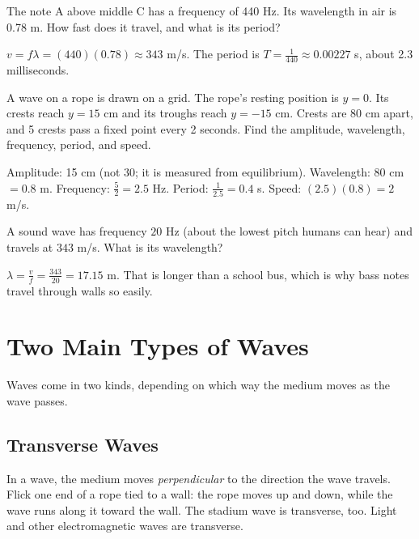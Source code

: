 \begin{Worked}
\begin{Problem}
The note A above middle C has a frequency of
440 Hz. Its wavelength in air is 0.78 m. How fast does it travel, and what
is its period?
\end{Problem}
\begin{Solution}
$v = f\lambda = (440)(0.78) \approx 343$ m/s. The period
is $T = \frac{1}{440} \approx 0.00227$ s, about 2.3 milliseconds.
\end{Solution}
\end{Worked}

\begin{Exercise}[title={Label the wave}, label=wave_label]
A wave on a rope is drawn on a grid. The rope's resting position is
$y = 0$. Its crests reach $y = 15$ cm and its troughs reach $y = -15$ cm.
Crests are 80 cm apart, and 5 crests pass a fixed point every 2 seconds.
Find the amplitude, wavelength, frequency, period, and speed.
\end{Exercise}
\begin{Answer}[ref=wave_label]
Amplitude: 15 cm (not 30; it is measured from equilibrium). Wavelength:
80 cm $= 0.8$ m. Frequency: $\frac{5}{2} = 2.5$ Hz. Period:
$\frac{1}{2.5} = 0.4$ s. Speed: $(2.5)(0.8) = 2$ m/s.
\end{Answer}

\begin{Exercise}[title={Wavelength of a Low Note}, label=wave1]
A sound wave has frequency $20$ Hz (about the lowest pitch humans can hear)
and travels at $343$ m/s. What is its wavelength?
\end{Exercise}
\begin{Answer}[ref=wave1]
$\lambda = \frac{v}{f} = \frac{343}{20} = 17.15$ m. That is longer than a
school bus, which is why bass notes travel through walls so easily.
\end{Answer}

\section{Two Main Types of Waves}

Waves come in two kinds, depending on which way the medium moves as the wave
passes.

\subsection*{Transverse Waves}
In a  wave, the medium moves
\emph{perpendicular} to the direction the wave travels. Flick one end of a
rope tied to a wall: the rope moves up and down, while the wave runs along
it toward the wall. The stadium wave is transverse, too. Light and other
electromagnetic waves are transverse.

